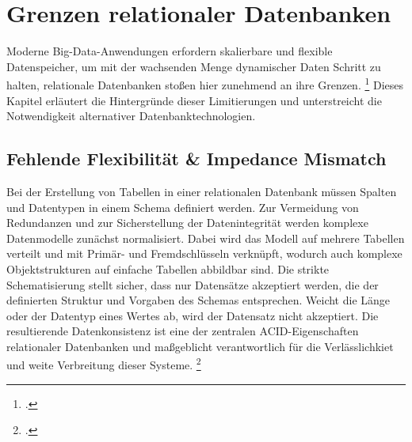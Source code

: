 \section{Grenzen relationaler Datenbanken}


Moderne Big-Data-Anwendungen erfordern skalierbare und flexible Datenspeicher, um mit der wachsenden Menge dynamischer Daten Schritt zu halten, relationale Datenbanken stoßen hier zunehmend an ihre Grenzen. \footcite[S. 1]{schreinerWhenRelationalBasedApplications2019} Dieses Kapitel erläutert die Hintergründe dieser Limitierungen und unterstreicht die Notwendigkeit alternativer Datenbanktechnologien. 

\subsection{Fehlende Flexibilität \& Impedance Mismatch}

Bei der Erstellung von Tabellen in einer relationalen Datenbank müssen Spalten und Datentypen in einem Schema definiert werden. Zur Vermeidung von Redundanzen und zur Sicherstellung der Datenintegrität werden komplexe Datenmodelle zunächst normalisiert. Dabei wird das Modell auf mehrere Tabellen verteilt und mit Primär- und Fremdschlüsseln verknüpft, wodurch auch komplexe Objektstrukturen auf einfache Tabellen abbildbar sind. Die strikte Schematisierung stellt sicher, dass nur Datensätze akzeptiert werden, die der definierten Struktur und Vorgaben des Schemas entsprechen. Weicht die Länge oder der Datentyp eines Wertes ab, wird der Datensatz nicht akzeptiert. Die resultierende Datenkonsistenz ist eine der zentralen ACID-Eigenschaften relationaler Datenbanken und maßgeblicht verantwortlich für die Verlässlichkiet und weite Verbreitung dieser Systeme. \footcite[S. 3]{phiriComparativeStudyNoSQL2017}

